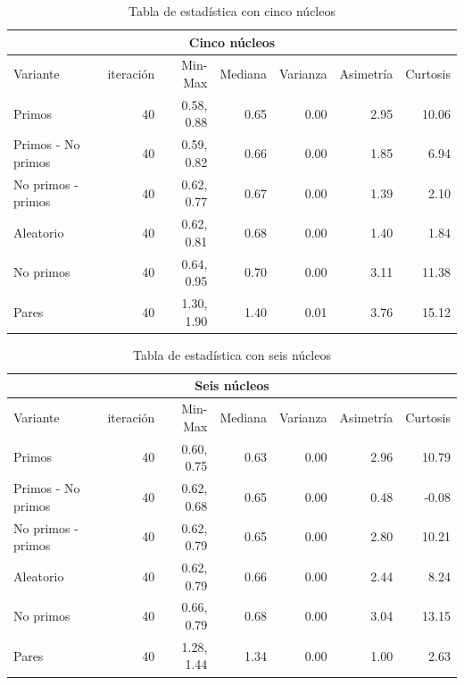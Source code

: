 \documentclass{article}
\begin{document}
\begin{table}[H]
\begin{center}
\begin{tabular}{|l | r | r | r | r | r | r|}
\hline
\multicolumn{7}{|c|}{Cinco núcleos}\\
\hline
Variante&iteración&Min-Max&Mediana&Varianza&Asimetría&Curtosis\\
\hline
 Primos               & 40 & 0.58, 0.88  & 0.65 & 0.00 & 2.95   & 10.06\\
 Primos - No primos   & 40 & 0.59, 0.82  & 0.66 & 0.00 & 1.85   & 6.94\\
 No primos - primos   & 40 & 0.62, 0.77  & 0.67 & 0.00 & 1.39   & 2.10\\
 Aleatorio            & 40 & 0.62, 0.81  & 0.68 & 0.00 & 1.40   & 1.84\\
 No primos            & 40 & 0.64, 0.95  & 0.70 & 0.00 & 3.11   & 11.38\\
 Pares                & 40 & 1.30, 1.90  & 1.40 & 0.01 & 3.76   & 15.12\\
\hline
\end{tabular}
\caption{Tabla de estadística con cinco núcleos}
\label{table:1}
\end{center}
\end{table}

\begin{table}[H]
\begin{center}
\begin{tabular}{|l | r | r | r | r | r | r|}
\hline
\multicolumn{7}{|c|}{Seis núcleos}\\
\hline
Variante&iteración&Min-Max&Mediana&Varianza&Asimetría&Curtosis\\
\hline
 Primos               & 40 & 0.60, 0.75  & 0.63 & 0.00 & 2.96   & 10.79\\
 Primos - No primos   & 40 & 0.62, 0.68  & 0.65 & 0.00 & 0.48   & -0.08\\
 No primos - primos   & 40 & 0.62, 0.79  & 0.65 & 0.00 & 2.80   & 10.21\\
 Aleatorio            & 40 & 0.62, 0.79  & 0.66 & 0.00 & 2.44   & 8.24\\
 No primos            & 40 & 0.66, 0.79  & 0.68 & 0.00 & 3.04   & 13.15\\
 Pares                & 40 & 1.28, 1.44  & 1.34 & 0.00 & 1.00   & 2.63\\
\hline
\end{tabular}
\caption{Tabla de estadística con seis núcleos}
\label{table:1}
\end{center}
\end{table}
\printbibliography
\end{document}
